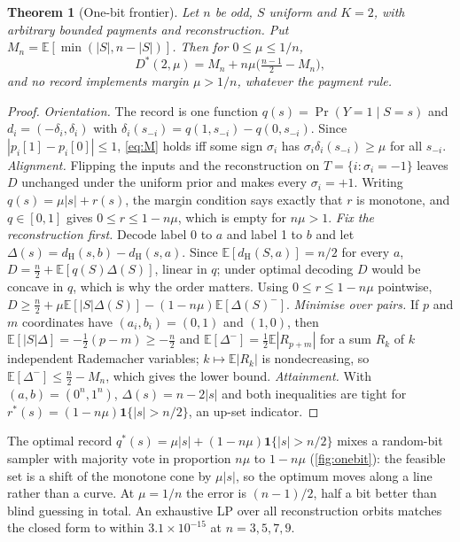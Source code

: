 \documentclass[sigconf,anonymous,acmthm=false]{acmart}
\theoremstyle{acmplain}
\newtheorem{theorem}{Theorem}
\theoremstyle{acmdefinition}
\newcommand{\E}{\mathbb{E}}
\newcommand{\dH}{d_{\mathrm{H}}}
\begin{document}
\begin{theorem}[One-bit frontier]\label{thm:onebit}
Let $n$ be odd, $S$ uniform and $K=2$, with arbitrary bounded payments and reconstruction.
Put $M_n=\E[\min(|S|,n-|S|)]$. Then for $0\le\mu\le1/n$,
\[ D^*(2,\mu)=M_n+n\mu\Big(\tfrac{n-1}{2}-M_n\Big), \]
and no record implements margin $\mu>1/n$, whatever the payment rule.
\end{theorem}

\begin{proof}
\emph{Orientation.} The record is one function $q(s)=\Pr(Y=1\mid S=s)$ and
$d_i=(-\delta_i,\delta_i)$ with $\delta_i(s_{-i})=q(1,s_{-i})-q(0,s_{-i})$. Since
$|p_i[1]-p_i[0]|\le1$, \eqref{eq:M} holds iff some sign $\sigma_i$ has
$\sigma_i\delta_i(s_{-i})\ge\mu$ for all $s_{-i}$. \emph{Alignment.} Flipping the inputs and
the reconstruction on $T=\{i:\sigma_i=-1\}$ leaves $D$ unchanged under the uniform prior and
makes every $\sigma_i=+1$. Writing $q(s)=\mu|s|+r(s)$, the margin condition says exactly that
$r$ is monotone, and $q\in[0,1]$ gives $0\le r\le1-n\mu$, which is empty for $n\mu>1$.
\emph{Fix the reconstruction first.} Decode label 0 to $a$ and label 1 to $b$ and let
$\Delta(s)=\dH(s,b)-\dH(s,a)$. Since $\E[\dH(S,a)]=n/2$ for every $a$,
$D=\frac n2+\E[q(S)\Delta(S)]$, linear in $q$; under optimal decoding $D$ would be concave in
$q$, which is why the order matters. Using $0\le r\le1-n\mu$ pointwise,
$D\ge\frac n2+\mu\E[|S|\Delta(S)]-(1-n\mu)\E[\Delta(S)^-]$. \emph{Minimise over pairs.} If
$p$ and $m$ coordinates have $(a_i,b_i)=(0,1)$ and $(1,0)$, then
$\E[|S|\Delta]=-\frac12(p-m)\ge-\frac n2$ and $\E[\Delta^-]=\frac12\E|R_{p+m}|$ for a sum $R_k$
of $k$ independent Rademacher variables; $k\mapsto\E|R_k|$ is nondecreasing, so
$\E[\Delta^-]\le\frac n2-M_n$, which gives the lower bound. \emph{Attainment.} With
$(a,b)=(0^n,1^n)$, $\Delta(s)=n-2|s|$ and both inequalities are tight for
$r^*(s)=(1-n\mu)\mathbf1\{|s|>n/2\}$, an up-set indicator.
\end{proof}

The optimal record $q^*(s)=\mu|s|+(1-n\mu)\mathbf1\{|s|>n/2\}$ mixes a random-bit sampler with
majority vote in proportion $n\mu$ to $1-n\mu$ (\cref{fig:onebit}): the feasible set is a
shift of the monotone cone by $\mu|s|$, so the optimum moves along a line rather than a
curve. At $\mu=1/n$ the error is $(n-1)/2$, half a bit better than blind guessing in total.
An exhaustive LP over all reconstruction orbits matches the closed form to within
$3.1\times10^{-15}$ at $n=3,5,7,9$.
\end{document}
